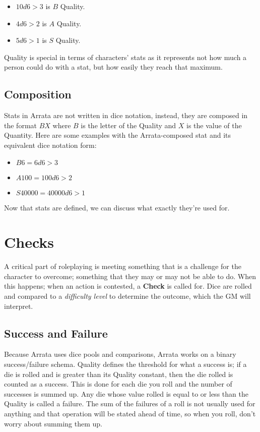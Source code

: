 \documentclass[../main.tex]{subfiles}
\begin{document}
    \begin{itemize}
        \item $10d6>3$ is $B$ Quality.
        \item $4d6>2$ is $A$ Quality.
        \item $5d6>1$ is $S$ Quality.
    \end{itemize}

    Quality is special in terms of characters' stats as it represents not how much a person could do with a stat, but how easily they reach that maximum.

    \subsection{Composition}

    Stats in Arrata are not written in dice notation, instead, they are composed in the format $BX$ where $B$ is the letter of the Quality and $X$ is the value of the Quantity. Here are some examples with the Arrata-composed stat and its equivalent dice notation form:

    \begin{itemize}
        \item $B6 = 6d6>3$
        \item $A100 = 100d6>2$
        \item $S40000 = 40000d6>1$
    \end{itemize}

    Now that stats are defined, we can discuss what exactly they're used for.

    \section{Checks}

    A critical part of roleplaying is meeting something that is a challenge for the character to overcome; something that they may or may not be able to do. When this happens; when an action is contested, a \textbf{Check} is called for. Dice are rolled and compared to a {\em difficulty level} to determine the outcome, which the GM will interpret.

    \subsection{Success and Failure}

    Because Arrata uses dice pools and comparisons, Arrata works on a binary success/failure schema. Quality defines the threshold for what a success is; if a die is rolled and is greater than its Quality constant, then the die rolled is counted as a success. This is done for each die you roll and the number of successes is summed up. Any die whose value rolled is equal to or less than the Quality is called a failure. The sum of the failures of a roll is not usually used for anything and that operation will be stated ahead of time, so when you roll, don't worry about summing them up.
\end{document}
